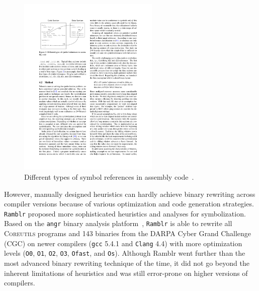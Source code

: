 \begin{figure}[tb]
  \centering
  \includegraphics[width=0.6\textwidth]{fig/uroboros.pdf}
  \caption{Different types of symbol references in assembly code~\cite{wang2015reassembleable}.}
  \label{fig:uroboros}
\end{figure}

However, manually designed heuristics can hardly achieve binary rewriting 
across compiler versions because of various optimization and code generation 
strategies.
\texttt{Ramblr} proposed more sophisticated heuristics and analyses for 
symbolization. Based on the \texttt{angr} binary analysis platform~\cite
{shoshitaishvili2016sok}, \texttt{Ramblr} is able to rewrite all \textsc
{Coreutils} programs and 143 binaries from the DARPA Cyber Grand Challenge 
(CGC) on newer compilers (\texttt{gcc} 5.4.1 and \texttt{Clang} 4.4) with more 
optimization levels (\texttt{O0}, \texttt{O1}, \texttt{O2}, \texttt{O3}, \texttt
{Ofast}, and \texttt{Os}). Although Ramblr went further than the most advanced 
binary rewriting technique of the time, it did not go beyond the inherent 
limitations of heuristics and was still error-prone on higher versions of 
compilers.

